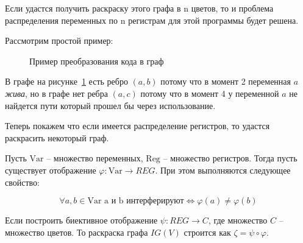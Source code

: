 Если удастся получить раскраску этого графа в n цветов, то и проблема распределения переменных по
n регистрам для этой программы будет решена.

Рассмотрим простой пример:

\begin{example}
    \begin{figure}[H]
        \centering
    \caption{Пример преобразования кода в граф}
    \label{fig:ex1}
    \end{figure}

    В графе на рисунке~\ref{fig:ex1} есть ребро $(a, b)$ потому что в момент 2 переменная $a$ \textit{жива}, но в графе нет ребра $(a, c)$
    потому что в момент 4 у переменной $a$ не найдется пути который прошел бы через использование.
\end{example}

Теперь покажем что если имеется распределение регистров, то удастся раскрасить некоторый граф.

Пусть $\text{Var}$ -- множество переменных, $\text{Reg}$ -- множество регистров.
Тогда пусть существует отображение $\varphi : \text{Var} \to REG$. При этом выполняются следующее свойство:

$$\forall a, b \in \text{Var} \text{ a и b интерферируют}  \Leftrightarrow \varphi(a) \neq \varphi(b)$$

Если построить биективное отображение $\psi: REG \to C$, где множество $C$ -- множество цветов.
То раскраска графа $IG(V)$ строится как $\zeta = \psi \circ \varphi$.

